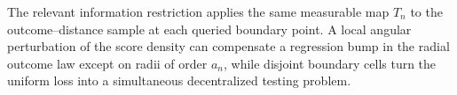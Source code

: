 The relevant information restriction applies the same measurable map \(T_n\) to the outcome--distance sample at each queried boundary point.  A local angular perturbation of the score density can compensate a regression bump in the radial outcome law except on radii of order \(a_n\), while disjoint boundary cells turn the uniform loss into a simultaneous decentralized testing problem.